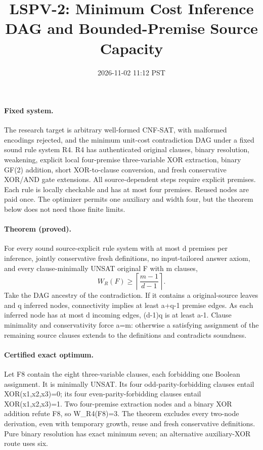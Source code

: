 \documentclass[11pt]{article}
\title{LSPV-2: Minimum Cost Inference DAG and Bounded-Premise Source Capacity}
\date{2026-11-02 11:12 PST}
\begin{document}
\maketitle
\paragraph{Fixed system.} The research target is arbitrary well-formed CNF-SAT, with malformed encodings rejected, and the minimum unit-cost contradiction DAG under a fixed sound rule system R4. R4 has authenticated original clauses, binary resolution, weakening, explicit local four-premise three-variable XOR extraction, binary GF(2) addition, short XOR-to-clause conversion, and fresh conservative XOR/AND gate extensions. All source-dependent steps require explicit premises. Each rule is locally checkable and has at most four premises. Reused nodes are paid once. The optimizer permits one auxiliary and width four, but the theorem below does not need those finite limits.
\paragraph{Theorem (proved).} For every sound source-explicit rule system with at most d premises per inference, jointly conservative fresh definitions, no input-tailored answer axiom, and every clause-minimally UNSAT original F with m clauses,
\[
 W_R(F)\ge \left\lceil\frac{m-1}{d-1}\right\rceil .
\]
Take the DAG ancestry of the contradiction. If it contains a original-source leaves and q inferred nodes, connectivity implies at least a+q-1 premise edges. As each inferred node has at most d incoming edges, (d-1)q is at least a-1. Clause minimality and conservativity force a=m: otherwise a satisfying assignment of the remaining source clauses extends to the definitions and contradicts soundness.
\paragraph{Certified exact optimum.} Let F8 contain the eight three-variable clauses, each forbidding one Boolean assignment. It is minimally UNSAT. Its four odd-parity-forbidding clauses entail XOR(x1,x2,x3)=0; its four even-parity-forbidding clauses entail XOR(x1,x2,x3)=1. Two four-premise extraction nodes and a binary XOR addition refute F8, so W_R4(F8)=3. The theorem excludes every two-node derivation, even with temporary growth, reuse and fresh conservative definitions. Pure binary resolution has exact minimum seven; an alternative auxiliary-XOR route uses six.
\end{document}
